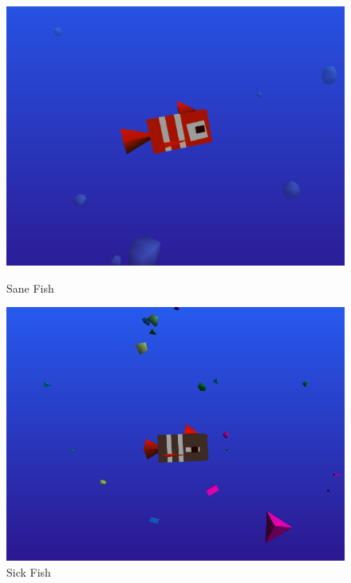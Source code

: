 \documentclass[a4paper,10pt]{article}
\begin{document}
\begin{figure}[H]
    \centering
    \begin{minipage}{0.45\textwidth}
        \centering
        \includegraphics[width=1\textwidth]{Screenshot_20190226_202824.png} %
        \caption{Sane Fish}
    \end{minipage}\hfill
    \begin{minipage}{0.45\textwidth}
        \centering
        \includegraphics[width=1\textwidth]{Screenshot_20190226_202756.png} %
        \caption{Sick Fish}
    \end{minipage}
\end{figure}
\end{document}
